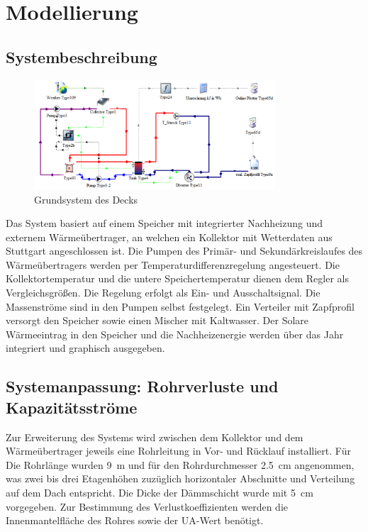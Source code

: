 \section{Modellierung}
\subsection{Systembeschreibung}
\begin{figure}[H]
	\centering
	\includegraphics[width=0.8\textwidth]{../DATA/std_deck.png}
	\caption[Grundsystem]{Grundsystem des Decks}
	\label{fig:std_deck}
\end{figure}

Das System basiert auf einem Speicher mit integrierter Nachheizung und externem Wärmeübertrager, an welchen ein Kollektor mit Wetterdaten aus Stuttgart angeschlossen ist. Die Pumpen des Primär- und Sekundärkreislaufes des Wärmeübertragers werden per Temperaturdifferenzregelung angesteuert. Die Kollektortemperatur und die untere Speichertemperatur dienen dem Regler als Vergleichsgrößen. Die Regelung erfolgt als Ein- und Ausschaltsignal. Die Massenströme sind in den Pumpen selbst festgelegt. Ein Verteiler mit Zapfprofil versorgt den Speicher sowie einen Mischer mit Kaltwasser. Der Solare Wärmeeintrag in den Speicher und die Nachheizenergie werden über das Jahr integriert und graphisch ausgegeben.

\subsection{Systemanpassung: Rohrverluste und Kapazitätsströme}
Zur Erweiterung des Systems wird  zwischen dem Kollektor und dem Wärmeübertrager jeweils eine Rohrleitung in Vor- und Rücklauf installiert. Für Die Rohrlänge wurden \SI{9}{\meter} und für den Rohrdurchmesser \SI{2,5}{\centi\meter} angenommen, was zwei bis drei Etagenhöhen zuzüglich horizontaler Abschnitte und Verteilung auf dem Dach entspricht. Die Dicke der Dämmschicht wurde mit \SI{5}{\centi\meter} vorgegeben. Zur Bestimmung des Verlustkoeffizienten werden die Innenmantelfläche des Rohres sowie der UA-Wert benötigt.

